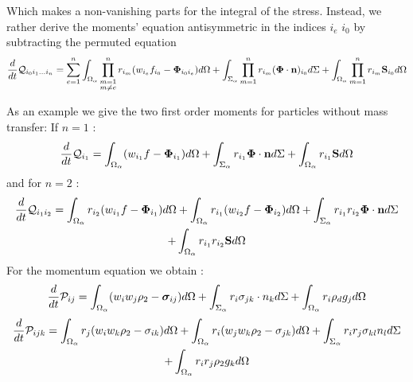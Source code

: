 Which makes a non-vanishing parts for the integral of the stress. 
Instead, we rather derive the moments' equation antisymmetric in the indices $i_e$ $i_0$ by subtracting the permuted equation
\begin{multline}
    \frac{d}{d t}{ \mathcal{Q}_{i_0 i_1\ldots i_n }}
    = \sum_{e=1}^{n} \int_{\Omega_\alpha} \prod^{n}_{\substack{ m=1 \\   m \neq e}} r_{i_m} (w_{i_e}f_{i_0}  - \mathbf{\Phi}_{i_0 i_e})d\Omega
    +\int_{\Sigma_\alpha} \prod_{m=1}^{n} r_{i_m} (\mathbf{\Phi} \cdot \textbf{n})_{i_0}d\Sigma
    + \int_{\Omega_\alpha} \prod_{m=1}^{n} r_{i_m} \textbf{S}_{i_0} d\Omega
\end{multline}

As an example we give the two first order moments for particles without mass transfer: 
If $n=1$ : 
\begin{equation}
    \frac{d}{d t}{ \mathcal{Q}_{i_1}}
    = \int_{\Omega_\alpha} (w_{i_1}f  - \mathbf{\Phi}_{i_1})d\Omega
    +\int_{\Sigma_\alpha} r_{i_1}\mathbf{\Phi} \cdot \textbf{n}d\Sigma
    + \int_{\Omega_\alpha}r_{i_1} \textbf{S} d\Omega
\end{equation}
and for $n=2$ : 
\begin{multline}
    \label{eq:moment_n2}
    \frac{d}{d t} {\mathcal{Q}_{i_1 i_2}}
    = 
    \int_{\Omega_\alpha} r_{i_2} (w_{i_1}f  - \mathbf{\Phi}_{i_1})d\Omega
    +\int_{\Omega_\alpha} r_{i_1} (w_{i_2}f  - \mathbf{\Phi}_{i_2})d\Omega
    +\int_{\Sigma_\alpha}  r_{i_1}r_{i_2} \mathbf{\Phi} \cdot \textbf{n}d\Sigma\\
    + \int_{\Omega_\alpha} r_{i_1}r_{i_2}  \textbf{S} d\Omega
\end{multline}
For the momentum equation we obtain : 
\begin{equation}
    \frac{d}{d t}{ \mathcal{P}_{ij}}
    = \int_{\Omega_\alpha} (w_{i}w_j \rho_2  - \bm{\sigma}_{ij})d\Omega
    +\int_{\Sigma_\alpha} r_{i} \sigma_{jk} \cdot n_k d\Sigma
    + \int_{\Omega_\alpha}r_{i} \rho_d g_j d\Omega
\end{equation}
\begin{multline*}
    \frac{d}{d t}{ \mathcal{P}_{i j k}}
    = 
    \int_{\Omega_\alpha} r_{j} (w_{i} w_k\rho_2 - \sigma_{ik})d\Omega
    +\int_{\Omega_\alpha} r_{i} (w_{j} w_k\rho_2 - \sigma_{jk})d\Omega
    +\int_{\Sigma_\alpha}  r_{i}r_{j} \sigma_{kl} n_l d\Sigma\\
    + \int_{\Omega_\alpha} r_{i}r_{j}  \rho_2 g_k d\Omega
\end{multline*}


